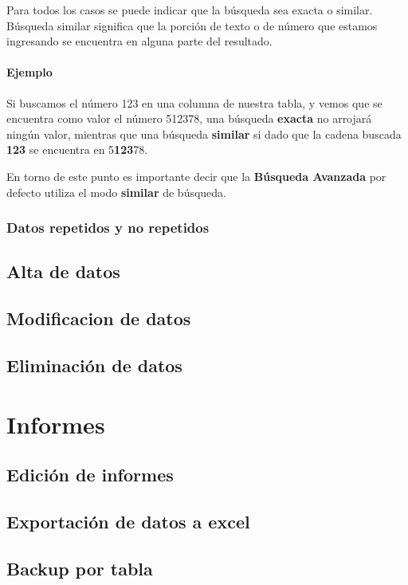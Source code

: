 \documentclass[a4paper,10pt]{article}
\begin{document}
Para todos los casos se puede indicar que la búsqueda sea exacta o similar. Búsqueda similar significa que la porción de texto o de número que estamos ingresando se encuentra en alguna parte del resultado.

\paragraph{Ejemplo} Si buscamos el número 123 en una columna de nuestra tabla, y vemos que se encuentra como valor el número 512378, una búsqueda \textbf{exacta} no arrojará ningún valor, mientras que una búsqueda \textbf{similar} si dado que la cadena buscada \textbf{123} se encuentra en 5\textbf{123}78.

En torno de este punto es importante decir que la \textbf{Búsqueda Avanzada} por defecto utiliza el modo \textbf{similar} de búsqueda.

\subsubsection{Datos repetidos y no repetidos}



\subsection{Alta de datos}
\subsection{Modificacion de datos}
\subsection{Eliminación de datos}


\section{Informes}
\subsection{Edición de informes}
\subsection{Exportación de datos a excel}
\subsection{Backup por tabla}
\end{document}
